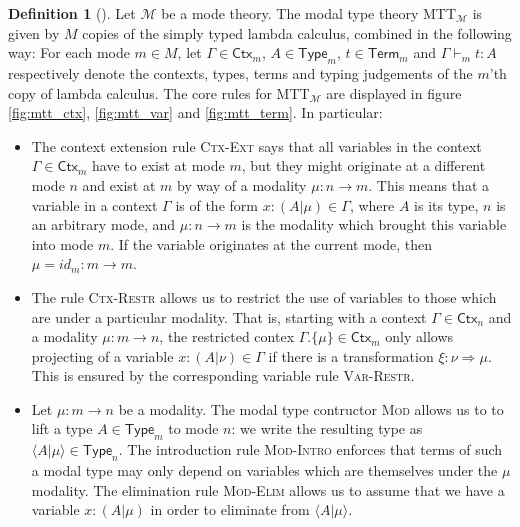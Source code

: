 \documentclass{scrartcl}
\theoremstyle{definition}
\newtheorem{definition}{Definition}
\theoremstyle{plain}
\begin{document}
\begin{definition}[{\cite[following Chapter 6.2]{gratzer2023syntax}}]
  Let $\mathcal{M}$ be a mode theory. The modal type theory
  MTT${}_{\mathcal{M}}$ is given by $M$ copies of
  the simply typed lambda calculus, combined in the following way:
  For each mode $m \in M$, let $\Gamma\in\textsf{Ctx}_m$, $A \in
  \textsf{Type}_m$, $t \in \textsf{Term}_m$ and
  $\Gamma \vdash_m t : A$ respectively denote the contexts, types, terms and
  typing judgements of the $m$'th copy of lambda calculus. The core rules for
  MTT${}_{\mathcal{M}}$ are displayed in figure \ref{fig:mtt_ctx},
  \ref{fig:mtt_var} and \ref{fig:mtt_term}. In particular:
  \begin{itemize}
  \item The context extension rule \textsc{Ctx-Ext} says that all variables in
    the context $\Gamma \in \textsf{Ctx}_m$ have to exist at mode $m$, but
    they might
    originate at a different mode $n$ and exist at $m$ by way of a modality
    $\mu : n \to m$. This means that a variable in a context $\Gamma$ is of the
    form $x : (A | \mu) \in \Gamma$, where $A$ is its type, $n$ is an arbitrary
    mode, and $\mu : n \to m$ is the modality which
    brought this variable into mode $m$. If the variable originates at the current
    mode, then $\mu = id_m : m \to m$.
  \item The rule \textsc{Ctx-Restr} allows us to restrict the use of variables
    to those which are under a particular modality. That is, starting with a
    context $\Gamma \in \textsf{Ctx}_n$ and a modality $\mu : m \to n$, the
    restricted contex $\Gamma.\{\mu\}\in\textsf{Ctx}_m$ only allows projecting of a variable $x :
    (A | \nu) \in \Gamma$ if there is a transformation $\xi : \nu \Rightarrow
    \mu$. This is ensured by the corresponding variable rule \textsc{Var-Restr}.
  \item Let $\mu : m \to n$ be a modality. The modal type contructor
    \textsc{Mod} allows us to to lift a type $A \in
    \textsf{Type}_m$ to mode $n$: we write the resulting type as $\langle A | \mu \rangle \in
    \textsf{Type}_n$. The introduction rule \textsc{Mod-Intro} enforces that
    terms of such a modal type may only depend on variables
    which are themselves under the $\mu$ modality. The elimination rule \textsc{Mod-Elim} allows
    us to assume that we have a variable $x : (A|\mu)$ in order to eliminate
    from $\langle A | \mu \rangle$.

  \end{itemize}
\end{definition}
\end{document}
